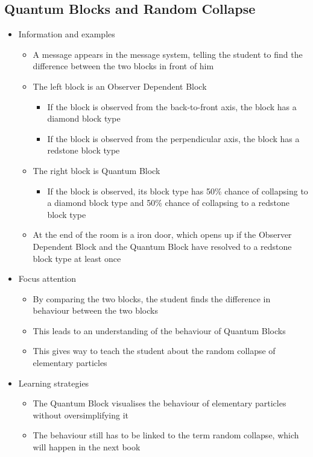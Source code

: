 \documentclass[11pt,twoside]{report} %
\begin{document}
\subsection{Quantum Blocks and Random Collapse}
\begin{itemize}
	\item Information and examples
	\begin{itemize}
		\item A message appears in the message system, telling the student to find the difference between the two blocks in front of him
		\item The left block is an Observer Dependent Block
		\begin{itemize}
			\item If the block is observed from the back-to-front axis, the block has a diamond block type
			\item If the block is observed from the perpendicular axis, the block has a redstone block type
		\end{itemize}
		\item The right block is Quantum Block
		\begin{itemize}
			\item If the block is observed, its block type has 50\% chance of collapsing to a diamond block type and 50\% chance of collapsing to a redstone block type
		\end{itemize}
		\item At the end of the room is a iron door, which opens up if the Observer Dependent Block and the Quantum Block have resolved to a redstone block type at least once
	\end{itemize}
	\item Focus attention
	\begin{itemize}
		\item By comparing the two blocks, the student finds the difference in behaviour between the two blocks
		\item This leads to an understanding of the behaviour of Quantum Blocks
		\item This gives way to teach the student about the random collapse of elementary particles
	\end{itemize}
	\item Learning strategies
	\begin{itemize}
		\item The Quantum Block visualises the behaviour of elementary particles without oversimplifying it
		\item The behaviour still has to be linked to the term random collapse, which will happen in the next book

\end{itemize}
\end{itemize}
\end{document}
